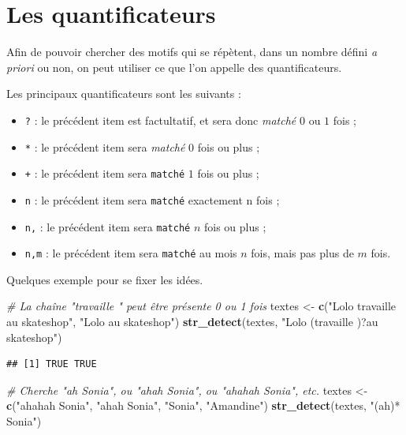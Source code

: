 \documentclass[
  11pt,
]{book}
\newenvironment{Shaded}{\begin{snugshade}}{\end{snugshade}}
\newcommand{\CommentTok}[1]{\textcolor[rgb]{0.56,0.35,0.01}{\textit{#1}}}
\newcommand{\KeywordTok}[1]{\textcolor[rgb]{0.13,0.29,0.53}{\textbf{#1}}}
\newcommand{\NormalTok}[1]{#1}
\newcommand{\StringTok}[1]{\textcolor[rgb]{0.31,0.60,0.02}{#1}}
\providecommand{\tightlist}{%
  \setlength{\itemsep}{0pt}\setlength{\parskip}{0pt}}
\numberwithin{equation}{section}
\numberwithin{countremarque}{section}
\begin{document}
\hypertarget{manip_regex_quantificateurs}{%
\section{Les quantificateurs}\label{manip_regex_quantificateurs}}

Afin de pouvoir chercher des motifs qui se répètent, dans un nombre défini \emph{a priori} ou non, on peut utiliser ce que l'on appelle des quantificateurs.

Les principaux quantificateurs sont les suivants :

\begin{itemize}
\tightlist
\item
  \texttt{?} : le précédent item est factultatif, et sera donc \emph{matché} \(0\) ou \(1\) fois ;
\item
  \texttt{*} : le précédent item sera \emph{matché} \(0\) fois ou plus ;
\item
  \texttt{+} : le précédent item sera \texttt{matché} \(1\) fois ou plus ;
\item
  \texttt{n} : le précédent item sera \texttt{matché} exactement n fois ;
\item
  \texttt{n,} : le précédent item sera \texttt{matché} \(n\) fois ou plus ;
\item
  \texttt{n,m} : le précédent item sera \texttt{matché} au mois \(n\) fois, mais pas plus de \(m\) fois.
\end{itemize}

Quelques exemple pour se fixer les idées.

\begin{Shaded}
\begin{Highlighting}[]
\CommentTok{\# La chaîne "travaille " peut être présente 0 ou 1 fois}
\NormalTok{textes \textless{}{-}}\StringTok{ }\KeywordTok{c}\NormalTok{(}\StringTok{"Lolo travaille au skateshop"}\NormalTok{, }\StringTok{"Lolo au skateshop"}\NormalTok{)}
\KeywordTok{str\_detect}\NormalTok{(textes, }\StringTok{"Lolo (travaille )?au skateshop"}\NormalTok{)}
\end{Highlighting}
\end{Shaded}

\begin{lstlisting}
## [1] TRUE TRUE
\end{lstlisting}

\begin{Shaded}
\begin{Highlighting}[]
\CommentTok{\# Cherche "ah Sonia", ou "ahah Sonia", ou "ahahah Sonia", etc.}
\NormalTok{textes \textless{}{-}}\StringTok{ }\KeywordTok{c}\NormalTok{(}\StringTok{"ahahah Sonia"}\NormalTok{, }\StringTok{"ahah Sonia"}\NormalTok{, }\StringTok{"Sonia"}\NormalTok{, }\StringTok{"Amandine"}\NormalTok{)}
\KeywordTok{str\_detect}\NormalTok{(textes, }\StringTok{"(ah)* Sonia"}\NormalTok{)}
\end{Highlighting}
\end{Shaded}
\end{document}
